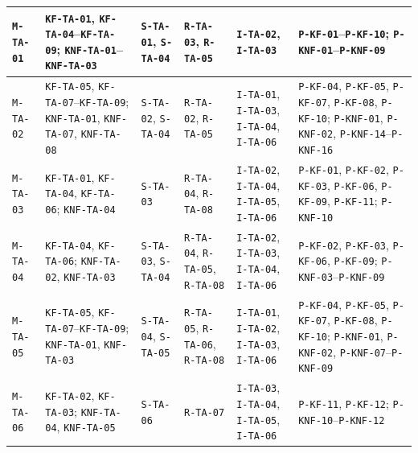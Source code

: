 \begin{longtable}{|p{}|p{}|p{}|p{}|p{}|p{}|}
	\texttt{M-TA-01} & \texttt{KF-TA-01}, \texttt{KF-TA-04}--\texttt{KF-TA-09}; \texttt{KNF-TA-01}--\texttt{KNF-TA-03}                     & \texttt{S-TA-01}, \texttt{S-TA-04} & \texttt{R-TA-03}, \texttt{R-TA-05}                   & \texttt{I-TA-02}, \texttt{I-TA-03}                                     & \texttt{P-KF-01}--\texttt{P-KF-10}; \texttt{P-KNF-01}--\texttt{P-KNF-09}                                                                                             \\ \hline
	\texttt{M-TA-02} & \texttt{KF-TA-05}, \texttt{KF-TA-07}--\texttt{KF-TA-09}; \texttt{KNF-TA-01}, \texttt{KNF-TA-07}, \texttt{KNF-TA-08} & \texttt{S-TA-02}, \texttt{S-TA-04} & \texttt{R-TA-02}, \texttt{R-TA-05}                   & \texttt{I-TA-01}, \texttt{I-TA-03}, \texttt{I-TA-04}, \texttt{I-TA-06} & \texttt{P-KF-04}, \texttt{P-KF-05}, \texttt{P-KF-07}, \texttt{P-KF-08}, \texttt{P-KF-10}; \texttt{P-KNF-01}, \texttt{P-KNF-02}, \texttt{P-KNF-14}--\texttt{P-KNF-16} \\ \hline
	\texttt{M-TA-03} & \texttt{KF-TA-01}, \texttt{KF-TA-04}, \texttt{KF-TA-06}; \texttt{KNF-TA-04}                                         & \texttt{S-TA-03}                   & \texttt{R-TA-04}, \texttt{R-TA-08}                   & \texttt{I-TA-02}, \texttt{I-TA-04}, \texttt{I-TA-05}, \texttt{I-TA-06} & \texttt{P-KF-01}, \texttt{P-KF-02}, \texttt{P-KF-03}, \texttt{P-KF-06}, \texttt{P-KF-09}, \texttt{P-KF-11}; \texttt{P-KNF-10}                                        \\ \hline
	\texttt{M-TA-04} & \texttt{KF-TA-04}, \texttt{KF-TA-06}; \texttt{KNF-TA-02}, \texttt{KNF-TA-03}                                        & \texttt{S-TA-03}, \texttt{S-TA-04} & \texttt{R-TA-04}, \texttt{R-TA-05}, \texttt{R-TA-08} & \texttt{I-TA-02}, \texttt{I-TA-03}, \texttt{I-TA-04}, \texttt{I-TA-06} & \texttt{P-KF-02}, \texttt{P-KF-03}, \texttt{P-KF-06}, \texttt{P-KF-09}; \texttt{P-KNF-03}--\texttt{P-KNF-09}                                                         \\ \hline
	\texttt{M-TA-05} & \texttt{KF-TA-05}, \texttt{KF-TA-07}--\texttt{KF-TA-09}; \texttt{KNF-TA-01}, \texttt{KNF-TA-03}                     & \texttt{S-TA-04}, \texttt{S-TA-05} & \texttt{R-TA-05}, \texttt{R-TA-06}, \texttt{R-TA-08} & \texttt{I-TA-01}, \texttt{I-TA-02}, \texttt{I-TA-03}, \texttt{I-TA-06} & \texttt{P-KF-04}, \texttt{P-KF-05}, \texttt{P-KF-07}, \texttt{P-KF-08}, \texttt{P-KF-10}; \texttt{P-KNF-01}, \texttt{P-KNF-02}, \texttt{P-KNF-07}--\texttt{P-KNF-09} \\ \hline
	\texttt{M-TA-06} & \texttt{KF-TA-02}, \texttt{KF-TA-03}; \texttt{KNF-TA-04}, \texttt{KNF-TA-05}                                        & \texttt{S-TA-06}                   & \texttt{R-TA-07}                                     & \texttt{I-TA-03}, \texttt{I-TA-04}, \texttt{I-TA-05}, \texttt{I-TA-06} & \texttt{P-KF-11}, \texttt{P-KF-12}; \texttt{P-KNF-10}--\texttt{P-KNF-12}                                                                                             \\ \hline

\end{longtable}
